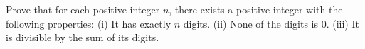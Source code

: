 Prove that for each positive integer $n$, there exists a positive integer with the following properties:
(i) It has exactly $n$ digits.
(ii) None of the digits is 0.
(iii) It is divisible by the sum of its digits.
